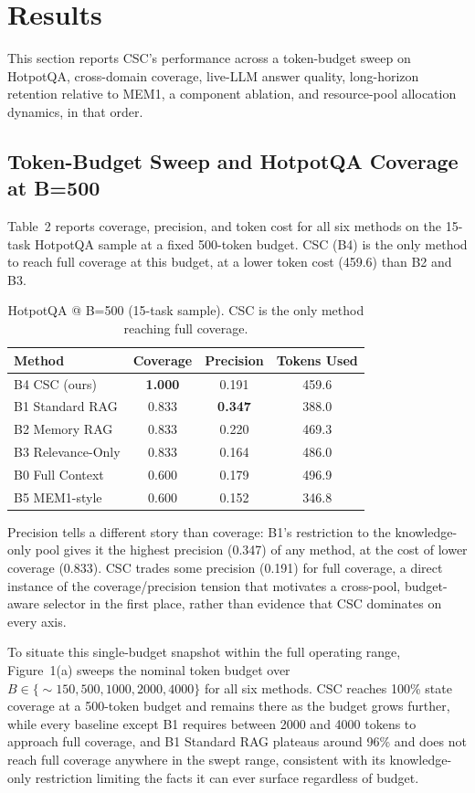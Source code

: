 \documentclass{article}
\begin{document}
\section{Results}

This section reports CSC's performance across a token-budget sweep on HotpotQA, cross-domain coverage, live-LLM answer quality, long-horizon retention relative to MEM1, a component ablation, and resource-pool allocation dynamics, in that order.

\subsection{Token-Budget Sweep and HotpotQA Coverage at B=500}

Table~2 reports coverage, precision, and token cost for all six methods on the 15-task HotpotQA sample at a fixed 500-token budget. CSC (B4) is the only method to reach full coverage at this budget, at a lower token cost (459.6) than B2 and B3.

\begin{table}[t]
\caption{HotpotQA @ B=500 (15-task sample). CSC is the only method reaching full coverage.}
\centering
\begin{tabular}{lccc}
\toprule
Method & Coverage & Precision & Tokens Used \\
\midrule
B4 CSC (ours) & \textbf{1.000} & 0.191 & 459.6 \\
B1 Standard RAG & 0.833 & \textbf{0.347} & 388.0 \\
B2 Memory RAG & 0.833 & 0.220 & 469.3 \\
B3 Relevance-Only & 0.833 & 0.164 & 486.0 \\
B0 Full Context & 0.600 & 0.179 & 496.9 \\
B5 MEM1-style & 0.600 & 0.152 & 346.8 \\
\bottomrule
\end{tabular}
\end{table}

Precision tells a different story than coverage: B1's restriction to the knowledge-only pool gives it the highest precision (0.347) of any method, at the cost of lower coverage (0.833). CSC trades some precision (0.191) for full coverage, a direct instance of the coverage/precision tension that motivates a cross-pool, budget-aware selector in the first place, rather than evidence that CSC dominates on every axis.

To situate this single-budget snapshot within the full operating range, Figure~1(a) sweeps the nominal token budget over $B \in \{\sim\!150, 500, 1000, 2000, 4000\}$ for all six methods. CSC reaches 100\% state coverage at a 500-token budget and remains there as the budget grows further, while every baseline except B1 requires between 2000 and 4000 tokens to approach full coverage, and B1 Standard RAG plateaus around 96\% and does not reach full coverage anywhere in the swept range, consistent with its knowledge-only restriction limiting the facts it can ever surface regardless of budget.
\end{document}

